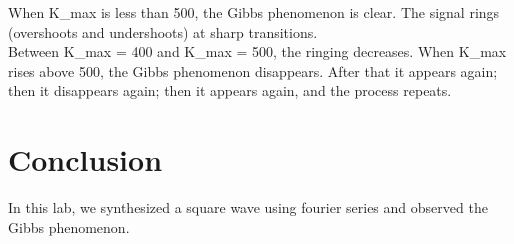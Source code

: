 \documentclass[11pt]{article}
\begin{document}
When K\_{max} is less than 500, the Gibbs phenomenon is clear.
The signal rings (overshoots and undershoots) at sharp transitions.\\

Between K\_{max} = 400 and K\_{max} = 500, the ringing decreases.
When K\_{max} rises above 500, the Gibbs phenomenon disappears.
After that it appears again; then it disappears again; 
then it appears again, and the process repeats.

\section{Conclusion}

In this lab, we synthesized a square wave using 
fourier series and observed the Gibbs phenomenon.
\end{document}
